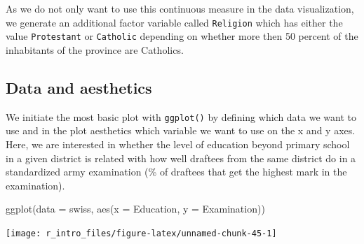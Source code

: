 \documentclass[
  12pt,
]{style/krantz}
\newenvironment{Shaded}{\begin{snugshade}}{\end{snugshade}}
\newcommand{\AttributeTok}[1]{\textcolor[rgb]{0.77,0.63,0.00}{#1}}
\newcommand{\CommentTok}[1]{\textcolor[rgb]{0.56,0.35,0.01}{\textit{#1}}}
\newcommand{\DecValTok}[1]{\textcolor[rgb]{0.00,0.00,0.81}{#1}}
\newcommand{\FunctionTok}[1]{\textcolor[rgb]{0.00,0.00,0.00}{#1}}
\newcommand{\NormalTok}[1]{#1}
\newcommand{\OtherTok}[1]{\textcolor[rgb]{0.56,0.35,0.01}{#1}}
\newcommand{\SpecialCharTok}[1]{\textcolor[rgb]{0.00,0.00,0.00}{#1}}
\newcommand{\StringTok}[1]{\textcolor[rgb]{0.31,0.60,0.02}{#1}}
\begin{document}
As we do not only want to use this continuous measure in the data visualization, we generate an additional factor variable called \texttt{Religion} which has either the value \texttt{\textquotesingle{}Protestant\textquotesingle{}} or \texttt{\textquotesingle{}Catholic\textquotesingle{}} depending on whether more then 50 percent of the inhabitants of the province are Catholics.

\begin{Shaded}
\end{Shaded}

\hypertarget{data-and-aesthetics}{%
\subsection{Data and aesthetics}\label{data-and-aesthetics}}

We initiate the most basic plot with \texttt{ggplot()} by defining which data we want to use and in the plot aesthetics which variable we want to use on the x and y axes. Here, we are interested in whether the level of education beyond primary school in a given district is related with how well draftees from the same district do in a standardized army examination (\% of draftees that get the highest mark in the examination).

\begin{Shaded}
\begin{Highlighting}[]
\FunctionTok{ggplot}\NormalTok{(}\AttributeTok{data =}\NormalTok{ swiss, }\FunctionTok{aes}\NormalTok{(}\AttributeTok{x =}\NormalTok{ Education, }\AttributeTok{y =}\NormalTok{ Examination))}
\end{Highlighting}
\end{Shaded}

\texttt{[image: r\_intro\_files/figure-latex/unnamed-chunk-45-1]}
\end{document}
